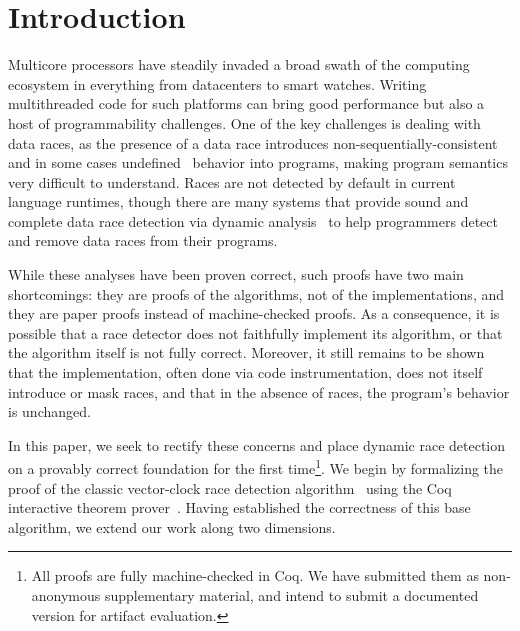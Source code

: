 \documentclass[preprint, 9pt]{sigplanconf}
\begin{document}


\section{Introduction}

Multicore processors have steadily invaded a broad swath of the computing ecosystem in everything from datacenters to smart watches. Writing multithreaded code for such platforms can bring good performance but also a host of programmability challenges. One of the key challenges is dealing with data races, as the presence of a data race introduces non-sequentially-consistent~\cite{manson_java_2005} and in some cases undefined~\cite{boehm_foundations_2008} behavior into programs, making program semantics very difficult to understand. Races are not detected by default in current language runtimes, though there are many systems that provide sound and complete data race detection via dynamic analysis~\cite{djit+,fasttrack,slimstate} to help programmers detect and remove data races from their programs. 

While these analyses have been proven correct, such proofs have two main shortcomings: they are proofs of the algorithms, not of the implementations, and they are paper proofs instead of machine-checked proofs. As a consequence, it is possible that a race detector does not faithfully implement its algorithm, or that the algorithm itself is not fully correct. Moreover, it still remains to be shown that the implementation, often done via code instrumentation, does not itself introduce or mask races, and that in the absence of races, the program's behavior is unchanged.

In this paper, we seek to rectify these concerns and place dynamic race detection on a provably correct foundation for the first time\footnote{All proofs are fully machine-checked in Coq. We have submitted them as non-anonymous supplementary material, and intend to submit a documented version for artifact evaluation.}. We begin by formalizing the proof of the classic vector-clock race detection algorithm~\cite{vcfidge,vcmattern} using the Coq interactive theorem prover~\cite{coq}. Having established the correctness of this base algorithm, we extend our work along two dimensions. 
\end{document}
